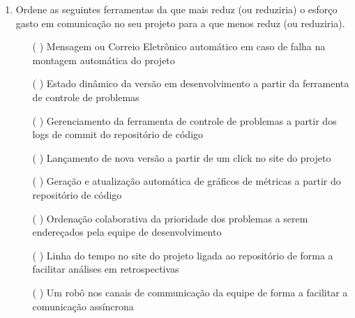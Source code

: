 \begin{enumerate}
\item Ordene as seguintes ferramentas da que mais reduz (ou reduziria)
  o esforço gasto em comunicação no seu projeto para a que menos reduz
  (ou reduziria).
  \begin{itemize}
  \item[( )] Mensagem ou Correio Eletrônico automático em caso de
    falha na montagem automática do projeto
  \item[( )] Estado dinâmico da versão em desenvolvimento a partir da
    ferramenta de controle de problemas
  \item[( )] Gerenciamento da ferramenta de controle de problemas a
    partir dos logs de commit do repositório de código
  \item[( )] Lançamento de nova versão a partir de um click no site do
    projeto
  \item[( )] Geração e atualização automática de gráficos de métricas
    a partir do repositório de código
  \item[( )] Ordenação colaborativa da prioridade dos problemas a
    serem endereçados pela equipe de desenvolvimento
  \item[( )] Linha do tempo no site do projeto ligada ao repositório
    de forma a facilitar análises em retrospectivas
  \item[( )] Um robô nos canais de communicação da equipe de forma a
    facilitar a comunicação assíncrona
  \end{itemize}
\end{enumerate}
